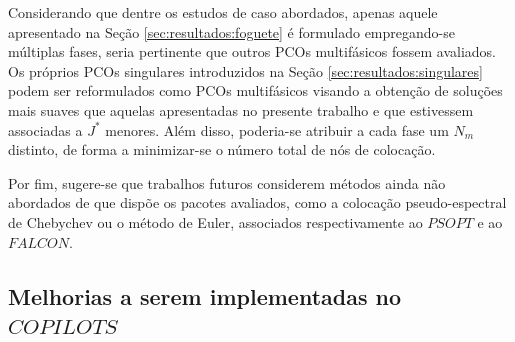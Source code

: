 Considerando que dentre os estudos de caso abordados, apenas aquele apresentado na Seção \ref{sec:resultados:foguete} é formulado empregando-se múltiplas fases, seria pertinente que outros PCOs multifásicos fossem avaliados. Os próprios PCOs singulares introduzidos na Seção \ref{sec:resultados:singulares} podem ser reformulados como PCOs multifásicos visando a obtenção de soluções mais suaves que aquelas apresentadas no presente trabalho e que estivessem associadas a $ J^* $ menores. Além disso, poderia-se atribuir a cada fase um $ N_m $ distinto, de forma a minimizar-se o número total de nós de colocação. 

Por fim, sugere-se que trabalhos futuros considerem métodos ainda não abordados de que dispõe os pacotes avaliados, como a colocação pseudo-espectral de Chebychev ou o método de Euler, associados respectivamente ao $ PSOPT $ e ao $ FALCON $.

\subsection{Melhorias a serem implementadas no $ COPILOTS $}

